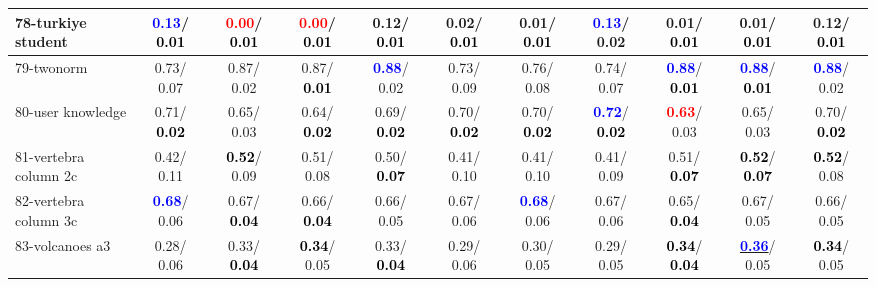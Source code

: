 \begin{table}[h]
\begin{center}
{\begin{tabular}{lc|c|c|c|c|c|c|c|c|c}
78-turkiye student & \textcolor{blue}{\textbf{  0.13}}/\textcolor{black}{\textbf{  0.01}} & \textcolor{red}{\textbf{  0.00}}/\textcolor{black}{\textbf{  0.01}} & \textcolor{red}{\textbf{  0.00}}/\textcolor{black}{\textbf{  0.01}} &   0.12/\textcolor{black}{\textbf{  0.01}} &   0.02/\textcolor{black}{\textbf{  0.01}} &   0.01/\textcolor{black}{\textbf{  0.01}} & \textcolor{blue}{\textbf{  0.13}}/  0.02 &   0.01/\textcolor{black}{\textbf{  0.01}} &   0.01/\textcolor{black}{\textbf{  0.01}} &   0.12/\textcolor{black}{\textbf{  0.01}} \\ \hline
79-twonorm &   0.73/  0.07 &   0.87/  0.02 &   0.87/\textcolor{black}{\textbf{  0.01}} & \textcolor{blue}{\textbf{  0.88}}/  0.02 &   0.73/  0.09 &   0.76/  0.08 &   0.74/  0.07 & \textcolor{blue}{\textbf{  0.88}}/\textcolor{black}{\textbf{  0.01}} & \textcolor{blue}{\textbf{  0.88}}/\textcolor{black}{\textbf{  0.01}} & \textcolor{blue}{\textbf{  0.88}}/  0.02 \\
80-user knowledge &   0.71/\textcolor{black}{\textbf{  0.02}} &   0.65/  0.03 &   0.64/\textcolor{black}{\textbf{  0.02}} &   0.69/\textcolor{black}{\textbf{  0.02}} &   0.70/\textcolor{black}{\textbf{  0.02}} &   0.70/\textcolor{black}{\textbf{  0.02}} & \textcolor{blue}{\textbf{  0.72}}/\textcolor{black}{\textbf{  0.02}} & \textcolor{red}{\textbf{  0.63}}/  0.03 &   0.65/  0.03 &   0.70/\textcolor{black}{\textbf{  0.02}} \\
81-vertebra column 2c &   0.42/  0.11 & \textcolor{black}{\textbf{  0.52}}/  0.09 &   0.51/  0.08 &   0.50/\textcolor{black}{\textbf{  0.07}} &   0.41/  0.10 &   0.41/  0.10 &   0.41/  0.09 &   0.51/\textcolor{black}{\textbf{  0.07}} & \textcolor{black}{\textbf{  0.52}}/\textcolor{black}{\textbf{  0.07}} & \textcolor{black}{\textbf{  0.52}}/  0.08 \\
82-vertebra column 3c & \textcolor{blue}{\textbf{  0.68}}/  0.06 &   0.67/\textcolor{black}{\textbf{  0.04}} &   0.66/\textcolor{black}{\textbf{  0.04}} &   0.66/  0.05 &   0.67/  0.06 & \textcolor{blue}{\textbf{  0.68}}/  0.06 &   0.67/  0.06 &   0.65/\textcolor{black}{\textbf{  0.04}} &   0.67/  0.05 &   0.66/  0.05 \\
83-volcanoes a3 &   0.28/  0.06 &   0.33/\textcolor{black}{\textbf{  0.04}} & \textcolor{black}{\textbf{  0.34}}/  0.05 &   0.33/\textcolor{black}{\textbf{  0.04}} &   0.29/  0.06 &   0.30/  0.05 &   0.29/  0.05 & \textcolor{black}{\textbf{  0.34}}/\textcolor{black}{\textbf{  0.04}} & \underline{\textcolor{blue}{\textbf{  0.36}}}/  0.05 & \textcolor{black}{\textbf{  0.34}}/  0.05 \\

\end{tabular}}
\end{center}
\end{table}
